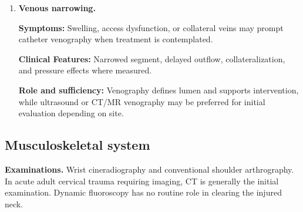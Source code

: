 \begin{enumerate}[leftmargin=*,itemsep=0.45em,topsep=0.4em]
\item \textbf{Venous narrowing.}\par\noindent\textbf{Symptoms:} Swelling, access dysfunction, or collateral veins may prompt catheter venography when treatment is contemplated.\par\noindent\textbf{Clinical Features:} Narrowed segment, delayed outflow, collateralization, and pressure effects where measured.\par\noindent\textbf{Role and sufficiency:} Venography defines lumen and supports intervention, while ultrasound or CT/MR venography may be preferred for initial evaluation depending on site.
\end{enumerate}

\subsection{Musculoskeletal system}
\textbf{Examinations.} Wrist cineradiography and conventional shoulder arthrography. In acute adult cervical trauma requiring imaging, CT is generally the initial examination. Dynamic fluoroscopy has no routine role in clearing the injured neck.

